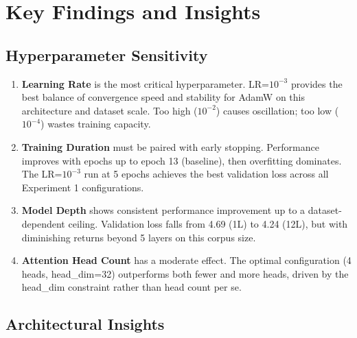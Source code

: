 \documentclass[12pt,a4paper]{article}
\begin{document}
\newpage
\section{Key Findings and Insights}

\subsection{Hyperparameter Sensitivity}

\begin{enumerate}[leftmargin=2cm]
  \item \textbf{Learning Rate} is the most critical hyperparameter. LR=$10^{-3}$ provides the best balance of convergence speed and stability for AdamW on this architecture and dataset scale. Too high ($10^{-2}$) causes oscillation; too low ($10^{-4}$) wastes training capacity.

  \item \textbf{Training Duration} must be paired with early stopping. Performance improves with epochs up to epoch 13 (baseline), then overfitting dominates. The LR=$10^{-3}$ run at 5 epochs achieves the best validation loss across all Experiment 1 configurations.

  \item \textbf{Model Depth} shows consistent performance improvement up to a dataset-dependent ceiling. Validation loss falls from 4.69 (1L) to 4.24 (12L), but with diminishing returns beyond 5 layers on this corpus size.

  \item \textbf{Attention Head Count} has a moderate effect. The optimal configuration (4 heads, head\_dim=32) outperforms both fewer and more heads, driven by the head\_dim constraint rather than head count per se.
\end{enumerate}

\subsection{Architectural Insights}
\end{document}
